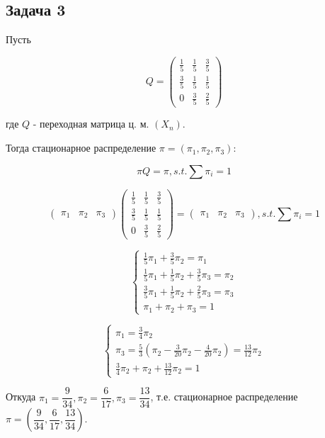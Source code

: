 \documentclass[a4paper,12pt]{article} %
\begin{document}
\subsection*{Задача 3}


Пусть

$$Q=\left(\begin{array}{lll}
\frac{1}{5} & \frac{1}{5} & \frac{3}{5} \\
\frac{3}{5} & \frac{1}{5} & \frac{1}{5} \\
0 & \frac{3}{5} & \frac{2}{5}
\end{array}\right)$$

где $Q$ - переходная матрица ц. м.  $(X_n)$. 


Тогда стационарное распределение $\pi=\left(\pi_{1}, \pi_{2}, \pi_{3}\right)$:

$$\pi Q=\pi, s.t. \sum \pi_i = 1 $$


$$\left(\begin{array}{lll}
\pi_{1} & \pi_{2} & \pi_{3}
\end{array}\right)\left(\begin{array}{lll}
\frac{1}{5} & \frac{1}{5} & \frac{3}{5} \\
\frac{3}{5} & \frac{1}{5} & \frac{1}{5} \\
0 & \frac{3}{5} & \frac{2}{5}
\end{array}\right) =\left(\begin{array}{lll}
\pi_{1} & \pi_{2} & \pi_{3}
\end{array}\right), s.t. \sum \pi_i = 1 $$

$$\left\{\begin{array}{l}
\frac{1}{5} \pi_{1}+\frac{3}{5} \pi_{2}=\pi_{1} \\
\frac{1}{5} \pi_{1}+\frac{1}{5} \pi_{2}+\frac{3}{5} \pi_{3}=\pi_{2} \\
\frac{3}{5} \pi_{1}+\frac{1}{5} \pi_{2}+\frac{2}{5} \pi_{3}=\pi_{3} \\
\pi_{1}+\pi_{2}+\pi_{3}=1
\end{array}\right.$$

$$\left\{\begin{array}{l}
\pi_{1}=\frac{3}{4} \pi_{2} \\
\pi_{3}= \frac{5}{3} ( \pi_{2}  -  \frac{3}{20} \pi_{2}   - \frac{4}{20} \pi_{2})  =  \frac{13}{12}  \pi_{2}  \\
\frac{3}{4} \pi_{2}+\pi_{2}+ \frac{13}{12}  \pi_{2}=1
\end{array}\right.$$


Откуда $\pi_{1} = \dfrac{9}{34}, \pi_{2} = \dfrac{6}{17}, \pi_{3} =  \dfrac{13}{34}$, т.е. стационарное распределение   \newline
$\pi=\left(\dfrac{9}{34}, \dfrac{6}{17}, \dfrac{13}{34}\right)$.
\end{document}
